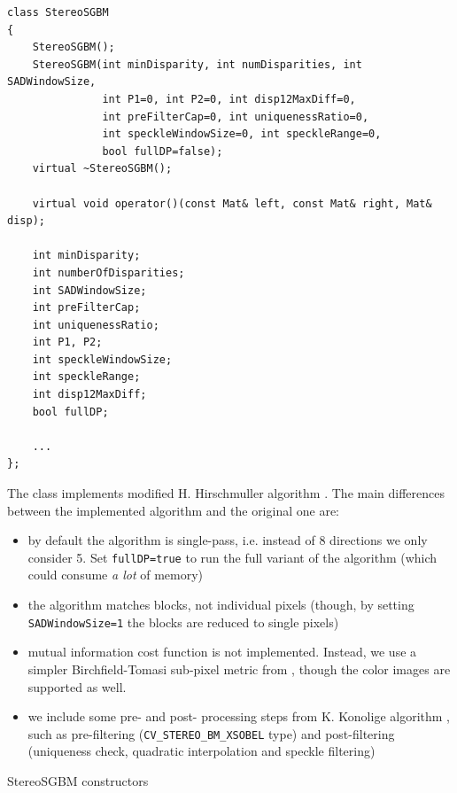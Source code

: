 \begin{lstlisting}
class StereoSGBM
{
    StereoSGBM();
    StereoSGBM(int minDisparity, int numDisparities, int SADWindowSize,
               int P1=0, int P2=0, int disp12MaxDiff=0,
               int preFilterCap=0, int uniquenessRatio=0,
               int speckleWindowSize=0, int speckleRange=0,
               bool fullDP=false);
    virtual ~StereoSGBM();
    
    virtual void operator()(const Mat& left, const Mat& right, Mat& disp);
    
    int minDisparity;
    int numberOfDisparities;
    int SADWindowSize;
    int preFilterCap;
    int uniquenessRatio;
    int P1, P2;
    int speckleWindowSize;
    int speckleRange;
    int disp12MaxDiff;
    bool fullDP;
    
    ...
};
\end{lstlisting}

The class implements modified H. Hirschmuller algorithm \cite{HH08}. The main differences between the implemented algorithm and the original one are:

\begin{itemize}
    \item by default the algorithm is single-pass, i.e. instead of 8 directions we only consider 5. Set \texttt{fullDP=true} to run the full variant of the algorithm (which could consume \emph{a lot} of memory)
    \item the algorithm matches blocks, not individual pixels (though, by setting \texttt{SADWindowSize=1} the blocks are reduced to single pixels)
    \item mutual information cost function is not implemented. Instead, we use a simpler Birchfield-Tomasi sub-pixel metric from \cite{BT96}, though the color images are supported as well.
    \item we include some pre- and post- processing steps from K. Konolige algorithm , such as pre-filtering (\texttt{CV\_STEREO\_BM\_XSOBEL} type) and post-filtering (uniqueness check, quadratic interpolation and speckle filtering)
\end{itemize}

StereoSGBM constructors

